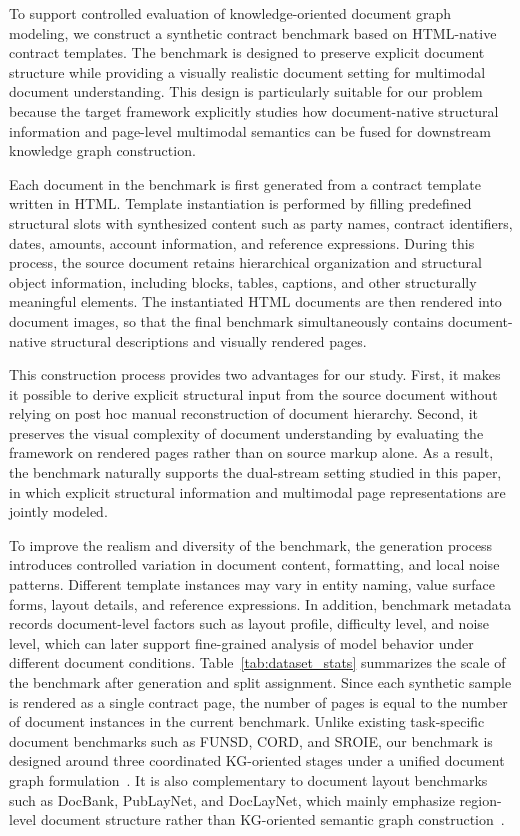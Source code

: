 \documentclass[pdflatex,twocolumn,iicol,sn-vancouver-num]{sn-jnl}%
\theoremstyle{thmstyleone}%
\theoremstyle{thmstyletwo}%
\theoremstyle{thmstylethree}%
\begin{document}
To support controlled evaluation of knowledge-oriented document graph modeling, we construct a synthetic contract benchmark based on HTML-native contract templates. The benchmark is designed to preserve explicit document structure while providing a visually realistic document setting for multimodal document understanding. This design is particularly suitable for our problem because the target framework explicitly studies how document-native structural information and page-level multimodal semantics can be fused for downstream knowledge graph construction.

Each document in the benchmark is first generated from a contract template written in HTML. Template instantiation is performed by filling predefined structural slots with synthesized content such as party names, contract identifiers, dates, amounts, account information, and reference expressions. During this process, the source document retains hierarchical organization and structural object information, including blocks, tables, captions, and other structurally meaningful elements. The instantiated HTML documents are then rendered into document images, so that the final benchmark simultaneously contains document-native structural descriptions and visually rendered pages.

This construction process provides two advantages for our study. First, it makes it possible to derive explicit structural input from the source document without relying on post hoc manual reconstruction of document hierarchy. Second, it preserves the visual complexity of document understanding by evaluating the framework on rendered pages rather than on source markup alone. As a result, the benchmark naturally supports the dual-stream setting studied in this paper, in which explicit structural information and multimodal page representations are jointly modeled.

To improve the realism and diversity of the benchmark, the generation process introduces controlled variation in document content, formatting, and local noise patterns. Different template instances may vary in entity naming, value surface forms, layout details, and reference expressions. In addition, benchmark metadata records document-level factors such as layout profile, difficulty level, and noise level, which can later support fine-grained analysis of model behavior under different document conditions. Table~\ref{tab:dataset_stats} summarizes the scale of the benchmark after generation and split assignment. Since each synthetic sample is rendered as a single contract page, the number of pages is equal to the number of document instances in the current benchmark. Unlike existing task-specific document benchmarks such as FUNSD, CORD, and SROIE, our benchmark is designed around three coordinated KG-oriented stages under a unified document graph formulation~\cite{jaumeFUNSDDatasetForm2019,parkCORDConsolidatedReceipt,huangICDAR2019CompetitionScanned2019}. It is also complementary to document layout benchmarks such as DocBank, PubLayNet, and DocLayNet, which mainly emphasize region-level document structure rather than KG-oriented semantic graph construction~\cite{liDocBankBenchmarkDataset2020,zhongPubLayNetLargestDataset2019,pfitzmannDocLayNetLargeHumanannotated2022}.
\end{document}
